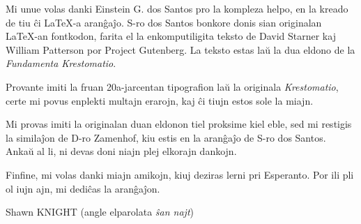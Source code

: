 \kolofono

Mi unue volas danki Einstein G. dos Santos pro la kompleza helpo, en la kreado de tiu ĉi \LaTeX{}-a aranĝaĵo.  S-ro dos Santos bonkore donis sian originalan \LaTeX{}-an fontkodon, farita el la enkomputiligita teksto de David Starner kaj William Patterson por Project Gutenberg.  La teksto estas laŭ la dua eldono de la \emph{Fundamenta Krestomatio}.

Provante imiti la fruan 20a-jarcentan tipografion laŭ la originala \emph{Krestomatio}, certe mi povus enplekti multajn erarojn, kaj ĉi tiujn estos sole la miajn.

Mi provas imiti la originalan duan eldonon tiel proksime kiel eble, sed mi restigis la similaĵon de D-ro Zamenhof, kiu estis en la aranĝaĵo de S-ro dos Santos.  Ankaŭ al li, ni devas doni niajn plej elkorajn dankojn.

Finfine, mi volas danki miajn amikojn, kiuj deziras lerni pri Esperanto.  Por ili pli ol iujn ajn, mi dediĉas la aranĝaĵon.

\vspace{1em}

{\setlength{\parindent}{0em}
Shawn KNIGHT (angle elparolata \emph{ŝan najt})\\
\hodiau}


